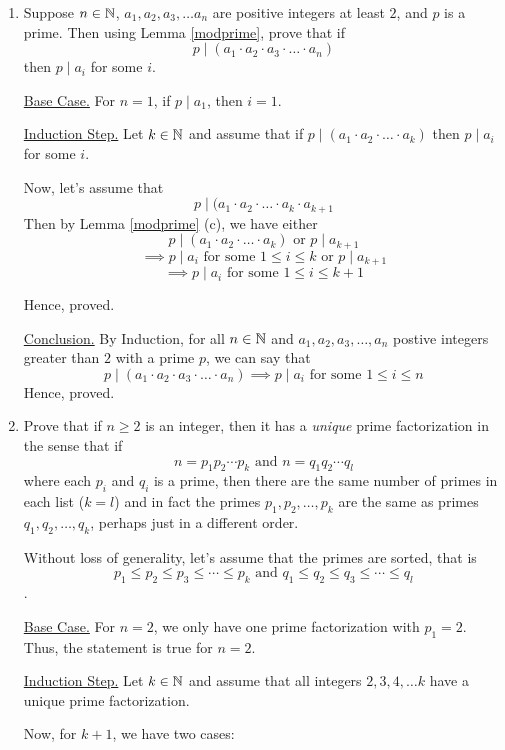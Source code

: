 \begin{enumerate}
	\item Suppose $n \in \mathbb{N}$, $a_1, a_2, a_3, \ldots a_n$ are positive integers at least $2$, and $p$ is a prime. Then using Lemma \ref{modprime}, prove that if 
		$$p \mid (a_1 \cdot a_2 \cdot a_3 \cdot \ldots \cdot a_n)$$
	then $p \mid a_i$ for some $i$.

	\bs
	\underline{Base Case.} For $n = 1$, if $p \mid a_1$, then $i = 1$.

	\underline{Induction Step.} Let $k \in \mathbb{N}$ and assume that if $p \mid (a_1 \cdot a_2 \cdot \ldots \cdot a_k)$ then $p \mid a_i$ for some $i$.

	Now, let's assume that 
	$$p \mid (a_1 \cdot a_2 \cdot \ldots \cdot a_k \cdot a_{k+1}$$
	Then by Lemma \ref{modprime} (c), we have either
	$$p \mid (a_1 \cdot a_2 \cdot \ldots \cdot a_k) \text{ or } p \mid a_{k+1}$$
	$$\implies p \mid a_i \text{ for some } 1 \leq i \leq k \text{ or } p \mid a_{k+1}$$
	$$\implies p \mid a_i \text{ for some } 1 \leq i \leq k+1$$

	Hence, proved.
	
	\underline{Conclusion.} By Induction, for all $n \in \mathbb{N}$ and $a_1, a_2, a_3, \ldots, a_n$ postive integers greater than $2$ with a prime $p$, we can say that
	$$p \mid (a_1 \cdot a_2 \cdot a_3 \cdot \ldots \cdot a_n) \implies p \mid a_i \text{ for some } 1 \leq i \leq n$$
	Hence, proved.
	\es

\item Prove that if $n \geq 2$ is an integer, then it has a \emph{unique} prime factorization in the sense that if 
	$$n = p_1 p_2 \cdots p_k \text{ and } n = q_1 q_2 \cdots q_l$$
	where each $p_i$ and $q_i$ is a prime, then there are the same number of primes in each list ($k=l$) and in fact the primes $p_1, p_2, \ldots, p_k$ are the same as primes $q_1, q_2, \ldots, q_k$, perhaps just in a different order.

	\bs
	Without loss of generality, let's assume that the primes are sorted, that is
	$$p_1 \leq p_2 \leq p_3 \leq \cdots \leq p_k \text{ and } q_1 \leq q_2 \leq q_3 \leq \cdots \leq q_l$$.

	\underline{Base Case.} For $n = 2$, we only have one prime factorization with $p_1 = 2$. Thus, the statement is true for $n = 2$.

	\underline{Induction Step.} Let $k \in \mathbb{N}$ and assume that all integers $2, 3, 4, \ldots k$ have a unique prime factorization.

	Now, for $k+1$, we have two cases:


\end{enumerate}
